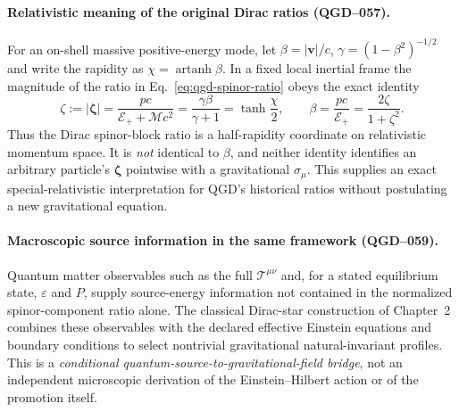 \documentclass[11pt,a4paper]{article}
\newcommand{\TT}{\mathcal T}
\begin{document}
\paragraph{Relativistic meaning of the original Dirac ratios (QGD--057).}
For an on-shell massive positive-energy mode, let $\beta=|\bm v|/c$, $\gamma=(1-\beta^2)^{-1/2}$ and write the rapidity as $\chi=\operatorname{artanh}\beta$.  In a fixed local inertial frame the magnitude of the ratio in Eq.~\eqref{eq:qgd-spinor-ratio} obeys the exact identity
\begin{equation}\label{eq:qgd060-half-rapidity}
 \boxed{\zeta:=|\bm\zeta|=\frac{pc}{\mathcal E_++\mathcal M c^2}
 =\frac{\gamma\beta}{\gamma+1}=\tanh\frac\chi2,\qquad
 \beta=\frac{pc}{\mathcal E_+}=\frac{2\zeta}{1+\zeta^2}.}
\end{equation}
Thus the Dirac spinor-block ratio is a half-rapidity coordinate on relativistic momentum space.  It is \emph{not} identical to $\beta$, and neither identity identifies an arbitrary particle's $\bm\zeta$ pointwise with a gravitational $\sigma_\mu$.  This supplies an exact special-relativistic interpretation for QGD's historical ratios without postulating a new gravitational equation.

\paragraph{Macroscopic source information in the same framework (QGD--059).}
Quantum matter observables such as the full $\TT^{\mu\nu}$ and, for a stated equilibrium state, $\varepsilon$ and $P$, supply source-energy information not contained in the normalized spinor-component ratio alone.  The classical Dirac-star construction of Chapter~2 combines these observables with the declared effective Einstein equations and boundary conditions to select nontrivial gravitational natural-invariant profiles.  This is a \emph{conditional quantum-source-to-gravitational-field bridge}, not an independent microscopic derivation of the Einstein--Hilbert action or of the promotion itself.
\end{document}
